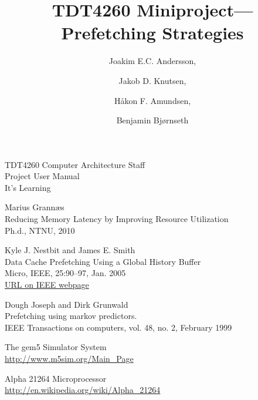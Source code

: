\documentclass[journal]{IEEEtran/IEEEtran}
\title{TDT4260 Miniproject---Prefetching Strategies}
\author{Joakim E.C. Andersson, \and Jakob D. Knutsen, \and Håkon F. Amundsen, \and Benjamin Bjørnseth}
\begin{document}
\maketitle











\begin{thebibliography}{9}

TDT4260 Computer Architecture Staff\\
Project User Manual\\
It's Learning

Marius Grannæs\\
Reducing Memory Latency by Improving Resource Utilization\\
Ph.d., NTNU, 2010

  Kyle J. Nestbit and James E. Smith\\
  Data Cache Prefetching Using a Global History Buffer\\
  Micro, IEEE, 25:90–97, Jan. 2005\\
  \href{http://ieeexplore.ieee.org/stamp/stamp.jsp?tp=&arnumber=1410068&isnumber=30563}{URL
    on IEEE webpage}

Dough Joseph and Dirk Grunwald\\
Prefetching using markov predictors.\\
IEEE Transactions on computers, vol. 48, no. 2, February 1999

The gem5 Simulator System\\
\url{http://www.m5sim.org/Main_Page}

Alpha 21264 Microprocessor\\
\url{http://en.wikipedia.org/wiki/Alpha_21264}

\end{thebibliography}
\end{document}
